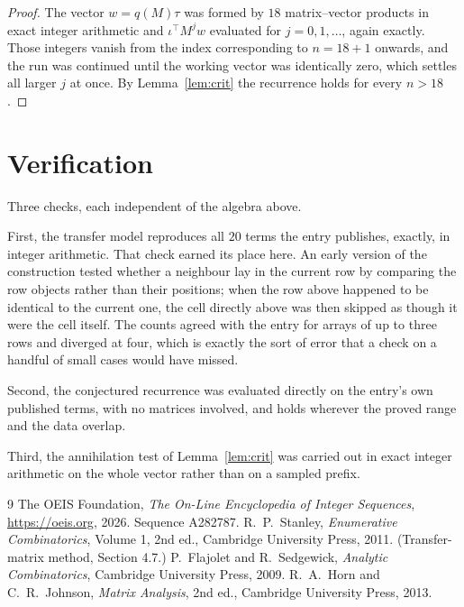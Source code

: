 \documentclass[11pt,a4paper]{article}
\theoremstyle{plain}
\theoremstyle{definition}
\begin{document}
\begin{proof}
The vector $w=q(M)\tau$ was formed by $18$ matrix--vector products in exact integer
arithmetic and $\iota^{\!\top}M^{j}w$ evaluated for $j=0,1,\dots$, again exactly. Those
integers vanish from the index corresponding to $n=18+1$ onwards, and the run was
continued until the working vector was identically zero, which settles all larger $j$ at once.
By Lemma~\ref{lem:crit} the recurrence holds for every $n>18$.
\end{proof}

\section{Verification}

Three checks, each independent of the algebra above.

First, the transfer model reproduces all $20$ terms the entry publishes, exactly, in
integer arithmetic. That check earned its place here. An early version of the construction
tested whether a neighbour lay in the current row by comparing the row objects rather
than their positions; when the row above happened to be identical to the current one, the
cell directly above was then skipped as though it were the cell itself. The counts agreed with
the entry for arrays of up to three rows and diverged at four, which is exactly the sort of
error that a check on a handful of small cases would have missed.

Second, the conjectured recurrence was evaluated directly on the entry's own published terms,
with no matrices involved, and holds wherever the proved range and the data overlap.

Third, the annihilation test of Lemma~\ref{lem:crit} was carried out in exact integer
arithmetic on the whole vector rather than on a sampled prefix.

\begin{thebibliography}{9}
 The OEIS Foundation, \emph{The On-Line Encyclopedia of Integer
Sequences}, \url{https://oeis.org}, 2026. Sequence A282787.
 R.~P.~Stanley, \emph{Enumerative Combinatorics}, Volume 1, 2nd ed.,
Cambridge University Press, 2011. (Transfer-matrix method, Section 4.7.)
 P.~Flajolet and R.~Sedgewick, \emph{Analytic Combinatorics}, Cambridge
University Press, 2009.
 R.~A.~Horn and C.~R.~Johnson, \emph{Matrix Analysis}, 2nd ed., Cambridge
University Press, 2013.
\end{thebibliography}
\end{document}
